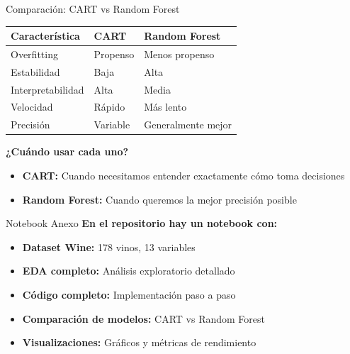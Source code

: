 \documentclass{beamer}
\begin{document}
\begin{frame}{Comparación: CART vs Random Forest}
    \begin{center}
        \begin{tabular}{p{3cm}|p{3cm}|p{3cm}}
            \toprule
            \textbf{Característica} & \textbf{CART} & \textbf{Random Forest} \\
            \midrule
            Overfitting & Propenso & Menos propenso \\
            Estabilidad & Baja & Alta \\
            Interpretabilidad & Alta & Media \\
            Velocidad & Rápido & Más lento \\
            Precisión & Variable & Generalmente mejor \\
            \bottomrule
        \end{tabular}
    \end{center}
    
    \vspace{1em}
    
    \textbf{¿Cuándo usar cada uno?}
    \begin{itemize}
        \item \textbf{CART:} Cuando necesitamos entender exactamente cómo toma decisiones
        \item \textbf{Random Forest:} Cuando queremos la mejor precisión posible
    \end{itemize}
\end{frame}

\begin{frame}{Notebook Anexo}
    \textbf{En el repositorio hay un notebook con:}
    
    \vspace{1em}
    
    \begin{itemize}
        \item \textbf{Dataset Wine:} 178 vinos, 13 variables
        \item \textbf{EDA completo:} Análisis exploratorio detallado
        \item \textbf{Código completo:} Implementación paso a paso
        \item \textbf{Comparación de modelos:} CART vs Random Forest
        \item \textbf{Visualizaciones:} Gráficos y métricas de rendimiento
    \end{itemize}
\end{frame}
\end{document}

